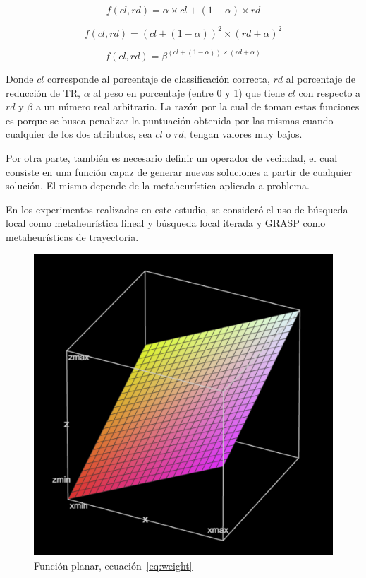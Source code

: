 \documentclass{ci5652}
\begin{document}
\begin{equation}\label{eq:weight}
f(cl,rd) = \alpha\times cl + (1 - \alpha)\times rd
\end{equation}

\begin{equation}\label{eq:sqr}
f(cl,rd) = (cl + (1 - \alpha))^{2}\times (rd + \alpha)^{2}
\end{equation}

\begin{equation}\label{eq:exp}
f(cl,rd) = \beta^{(cl + (1 - \alpha))\times (rd + \alpha)}
\end{equation}

Donde $cl$ corresponde al porcentaje de classificación correcta, $rd$ al porcentaje de reducción de TR, $\alpha$ al peso en porcentaje (entre 0 y 1) que tiene $cl$ con respecto a $rd$ y $\beta$ a un número real arbitrario. La razón por la cual de toman estas funciones es porque se busca penalizar la puntuación obtenida por las mismas cuando cualquier de los dos atributos, sea $cl$ o $rd$, tengan valores muy bajos.

Por otra parte, también es necesario definir un operador de vecindad, el cual consiste en una función capaz de generar nuevas soluciones a partir de cualquier solución. El mismo depende de la metaheurística aplicada a problema.

En los experimentos realizados en este estudio, se consideró el uso de búsqueda local como metaheurística lineal y búsqueda local iterada y GRASP como metaheurísticas de trayectoria.

\begin{figure}[p]
    \centering
    \includegraphics[width=0.8\linewidth]{weighted-3b}
    \caption{Función planar, ecuación~\ref{eq:weight}}
    \label{fig:weighted3}
\end{figure}
\end{document}
